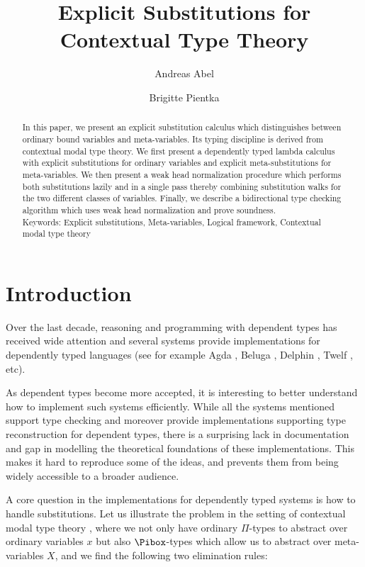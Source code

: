 \documentclass[copyright,creativecommons]{eptcs}
\title{Explicit Substitutions for Contextual Type Theory}
\author{Andreas Abel
\institute{Theoretical Computer Science, Ludwig-Maximilians-University
  Munich, Germany}
\email{andreas.abel@ifi.lmu.de}
\and
  Brigitte Pientka
\institute{School of Computer Science, McGill University, Montreal, Canada}
\email{bpientka@cs.mcgill.ca}
}
\begin{document}
\maketitle

\begin{abstract}
In this paper, we present an explicit substitution calculus
which distinguishes between ordinary bound variables and
meta-variables. Its typing discipline is derived from contextual modal
type theory. We first present a dependently typed lambda calculus with
explicit substitutions for  ordinary variables and explicit
meta-substitutions for meta-variables.  We then present a weak head
normalization procedure which performs both substitutions lazily and
in a single pass thereby combining substitution walks for the two
different classes of variables. Finally, we describe a bidirectional
type checking algorithm which uses weak head normalization and prove
soundness. 
\\
Keywords: 
Explicit substitutions,
Meta-variables,
Logical framework,
Contextual modal type theory
\end{abstract}


\section{Introduction}
Over the last decade, reasoning and programming with dependent types 
has received wide attention and several systems provide implementations
for dependently typed languages (see for example Agda \cite{boveDybjerNorell:tphols09,norell:PhD}, Beluga \cite{Pientka:PPDP08,pientkaDunfield:ijcar10}, Delphin \cite{Schuermann:ESOP08,poswolskySchuermann:delphin}, Twelf \cite{Pfenning99cade}, etc). 

As dependent types become more accepted, it is interesting to better
understand how to implement such systems efficiently.
While all the systems mentioned support type checking and moreover provide implementations 
supporting type reconstruction for dependent types, there is a
surprising lack in documentation and gap in modelling the theoretical foundations of these implementations. This makes it hard to reproduce some
of the ideas, and prevents them from being widely accessible to a
broader audience.

A core question in the implementations for dependently typed systems
is how to handle substitutions. Let us illustrate the problem in the
setting of contextual modal type theory \cite{Nanevski:ICML05}, where
we not only have ordinary $\Pi$-types to abstract over ordinary
variables $x$ but also $\Pibox$-types which allow us to abstract over
meta-variables $X$, and we find the following two elimination rules:
\end{document}
